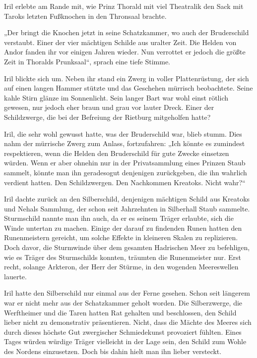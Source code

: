 Iril erlebte am Rande mit, wie Prinz Thorald mit viel Theatralik den Sack mit Taroks letzten Fußknochen in den Thronsaal brachte.

„Der bringt die Knochen jetzt in seine Schatzkammer, wo auch der Bruderschild verstaubt. Einer der vier mächtigen Schilde aus uralter Zeit. Die Helden von Andor fanden ihr vor einigen Jahren wieder. Nun verrottet er jedoch die größte Zeit in Thoralds Prunksaal“, sprach eine tiefe Stimme.

Iril blickte sich um. Neben ihr stand ein Zwerg in voller Plattenrüstung, der sich auf einen langen Hammer stützte und das Geschehen mürrisch beobachtete. Seine kahle Stirn glänze im Sonnenlicht. Sein langer Bart war wohl einst rötlich gewesen, nur jedoch eher braun und grau vor lauter Dreck. Einer der Schildzwerge, die bei der Befreiung der Rietburg mitgeholfen hatte?

Iril, die sehr wohl gewusst hatte, was der Bruderschild war, blieb stumm. Dies nahm der mürrische Zwerg zum Anlass, fortzufahren: „Ich könnte es zumindest respektieren, wenn die Helden den Bruderschild für gute Zwecke einsetzen würden. Wenn er aber ohnehin nur in der Privatsammlung eines Prinzen Staub sammelt, könnte man ihn geradesogut denjenigen zurückgeben, die ihn wahrlich verdient hatten. Den Schildzwergen. Den Nachkommen Kreatoks. Nicht wahr?“

Iril dachte zurück an den Silberschild, denjenigen mächtigen Schild aus Kreatoks und Nehals Sammlung, der schon seit Jahrzehnten in Silberhall Staub sammelte. Sturmschild nannte man ihn auch, da er es seinem Träger erlaubte, sich die Winde untertan zu machen. Einige der darauf zu findenden Runen hatten den Runenmeistern gereicht, um solche Effekte in kleineren Skalen zu replizieren. Doch davor, die Sturmwinde über dem gesamten Hadrischen Meer zu befehligen, wie es Träger des Sturmschilds konnten, träumten die Runenmeister nur. Erst recht, solange Arkteron, der Herr der Stürme, in den wogenden Meereswellen lauerte.

Iril hatte den Silberschild nur einmal aus der Ferne gesehen. Schon seit längerem war er nicht mehr aus der Schatzkammer geholt worden. Die Silberzwerge, die Werftheimer und die Taren hatten Rat gehalten und beschlossen, den Schild lieber nicht zu demonstrativ präsentieren. Nicht, dass die Mächte des Meeres sich durch dieses höchste Gut zwergischer Schmiedekunst provoziert fühlten. Eines Tages würden würdige Träger vielleicht in der Lage sein, den Schild zum Wohle des Nordens einzusetzen. Doch bis dahin hielt man ihn lieber versteckt.


